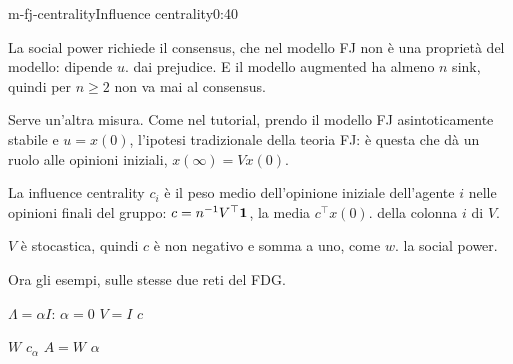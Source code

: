 \begin{slide}{m-fj-centrality}{Influence centrality}{0:40 {\color{red}}}
  \begin{discorso}
    \item La social power richiede il {\color{red}} {\color{blue}consensus,} che nel modello FJ non è una proprietà del modello: dipende {\color{red}} {\color{red}$u$.} {\color{blue}dai prejudice.} E il modello {\color{red}} {\color{blue}augmented} ha almeno $n$ sink, quindi per $n\ge2$ non va mai al {\color{red}} {\color{blue}consensus.}
    \item {\color{blue}Serve un'altra misura.} Come nel tutorial, {\color{red}} prendo il modello FJ asintoticamente stabile {\color{red}} {\color{blue}e} $u=x(0)$, l'ipotesi tradizionale della teoria {\color{red} } {\color{blue}FJ: è questa che dà un ruolo alle opinioni iniziali,} $x(\infty)=Vx(0)$.
    \item La influence centrality $c_i$ è il peso medio dell'opinione iniziale dell'agente $i$ nelle opinioni finali del gruppo: {\color{red}$c=n^{-1}V^\top\mathbf{1}$,} {\color{red}} la media {\color{red}   } {\color{red}$c^\top x(0)$.} {\color{blue}della colonna $i$ di $V$.}
    \item $V$ è stocastica, quindi $c$ è non negativo e somma a uno, come {\color{red}$w$.} {\color{blue}la social power.}
    \item {\color{blue}Ora gli esempi, sulle stesse due reti del FDG.}
    \item {\color{red}} {\color{red}$\Lambda=\alpha I$:} {\color{red}} {\color{red}$\alpha=0$} {\color{red} } {\color{red}$V=I$} {\color{red}} {\color{red}$c$} {\color{red}}
    \item {\color{red}       } {\color{red}$W$} {\color{red}  } {\color{red}$c_\alpha$} {\color{red}       } {\color{red}$A=W$} {\color{red}} {\color{red}$\alpha$} {\color{red}  }
    \item {\color{red}       }
  \end{discorso}
\end{slide}

